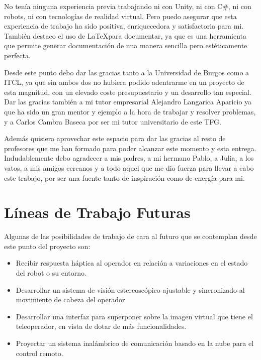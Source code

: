 No tenía ninguna experiencia previa trabajando ni con Unity, ni con C\#, ni con robots, ni con tecnologías de realidad virtual. Pero puedo asegurar que esta experiencia de trabajo ha sido positiva, enriquecedora y satisfactoria para mi. También destaco el uso de \LaTeX para documentar, ya que es una herramienta que permite generar documentación de una manera sencilla pero estéticamente perfecta.

Desde este punto debo dar las gracias tanto a la Universidad de Burgos como a ITCL, ya que sin ambos dos no hubiera podido adentrarme en un proyecto de esta magnitud, con un elevado coste presupuestario y un desarrollo tan especial. Dar las gracias también a mi tutor empresarial Alejandro Langarica Aparicio ya que ha sido un gran mentor y ejemplo a la hora de trabajar y resolver problemas, y a Carlos Cambra Baseca por ser mi tutor universitario de este TFG.

Además quisiera aprovechar este espacio para dar las gracias al resto de profesores que me han formado para poder alcanzar este momento y esta entrega. 
Indudablemente debo agradecer a mis padres, a mi hermano Pablo, a Julia, a los vatos, a mis amigos cercanos y a todo aquel que me dio fuerza para llevar a cabo este trabajo, por ser una fuente tanto de inspiración como de energía para mi.

\newpage

\section{Líneas de Trabajo Futuras}
Algunas de las posibilidades de trabajo de cara al futuro que se contemplan desde este punto del proyecto son:

\begin{itemize}
    \item Recibir respuesta háptica al operador en relación a variaciones en
el estado del robot o su entorno.
    \item Desarrollar un sistema de visión estereoscópico ajustable y sincronizado al movimiento de cabeza del operador
    \item Desarrollar una interfaz para superponer sobre la imagen virtual que tiene el teleoperador, en vista de dotar de más funcionalidades.
    \item Proyectar un sistema inalámbrico de comunicación basado en la nube para el control remoto.
\end{itemize}